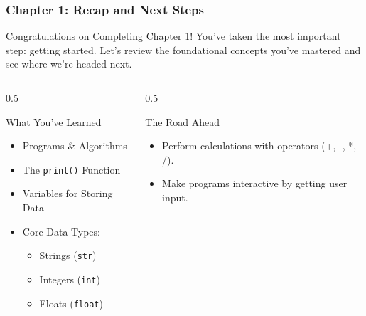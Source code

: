 \documentclass{beamer}
\begin{document}
\begin{frame}[fragile]
    \frametitle{Chapter 1: Recap and Next Steps}
    
    \begin{block}{Congratulations on Completing Chapter 1!}
        You've taken the most important step: getting started. Let's review the foundational concepts you've mastered and see where we're headed next.
    \end{block}
    
    \begin{columns}[T]
        \begin{column}{0.5\textwidth}
            \begin{alertblock}{What You've Learned}
                \begin{itemize}
                    \item Programs \& Algorithms
                    \item The \texttt{print()} Function
                    \item Variables for Storing Data
                    \item Core Data Types:
                    \begin{itemize}
                        \item Strings (\texttt{str})
                        \item Integers (\texttt{int})
                        \item Floats (\texttt{float})
                    \end{itemize}
                \end{itemize}
            \end{alertblock}
        \end{column}
        
        \begin{column}{0.5\textwidth}
            \begin{exampleblock}{The Road Ahead 🚀}
                \begin{itemize}
                    \item Perform calculations with operators (+, -, *, /).
                    \item Make programs interactive by getting user input.
                \end{itemize}
            \end{exampleblock}
        \end{column}
    \end{columns}
    
\end{frame}
\end{document}
